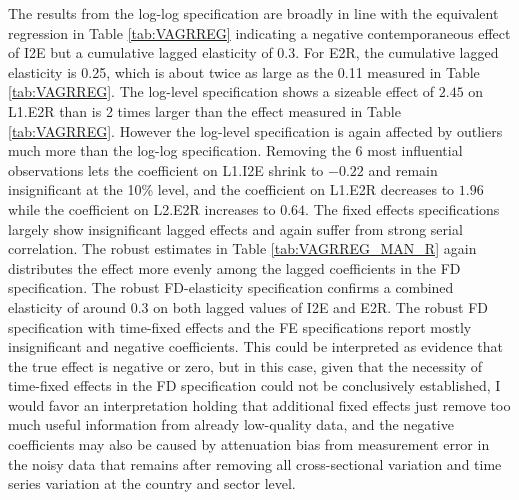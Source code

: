 \documentclass[a4paper]{article}
\begin{document}


The results from the log-log specification are broadly in line with the equivalent regression in Table \ref{tab:VAGRREG} indicating a negative contemporaneous effect of I2E but a cumulative lagged elasticity of 0.3. For E2R, the cumulative lagged elasticity is 0.25, which is about twice as large as the 0.11 measured in Table \ref{tab:VAGRREG}. The log-level specification shows a sizeable effect of $2.45$ on L1.E2R than is 2 times larger than the effect measured in Table \ref{tab:VAGRREG}. However the log-level specification is again affected by outliers much more than the log-log specification. Removing the 6 most influential observations lets the coefficient on L1.I2E shrink to $-0.22$ and remain insignificant at the 10\% level, and the coefficient on L1.E2R decreases to $1.96$ while the coefficient on L2.E2R increases to $0.64$. The fixed effects specifications largely show insignificant lagged effects and again suffer from strong serial correlation. The robust estimates in Table \ref{tab:VAGRREG_MAN_R} again distributes the effect more evenly among the lagged coefficients in the FD specification. The robust FD-elasticity specification confirms a combined elasticity of around 0.3 on both lagged values of I2E and E2R. The robust FD specification with time-fixed effects and the FE specifications report mostly insignificant and negative coefficients. This could be interpreted as evidence that the true effect is negative or zero, but in this case, given that the necessity of time-fixed effects in the FD specification could not be conclusively established, I would favor an interpretation   holding that additional fixed effects just remove too much useful information from already low-quality data, and the negative coefficients may also be caused by attenuation bias from measurement error in the noisy data that remains after removing all cross-sectional variation and time series variation at the country and sector level.
\end{document}

